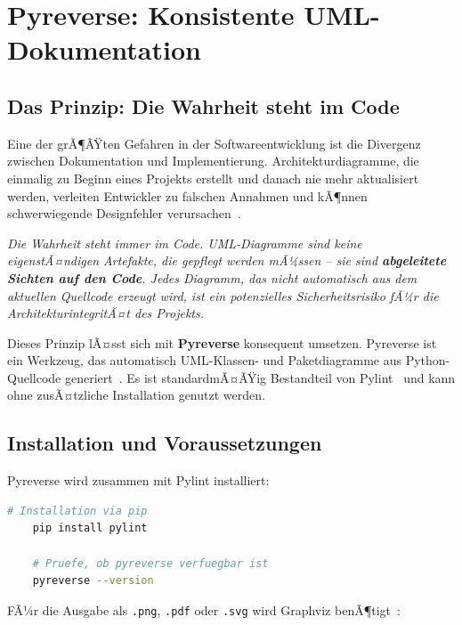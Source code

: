 ﻿\documentclass[a4paper,12pt]{article}
\begin{document}
\section{Pyreverse: Konsistente UML-Dokumentation}
\label{sec:pyreverse}

\subsection{Das Prinzip: Die Wahrheit steht im Code}

Eine der grÃ¶ÃŸten Gefahren in der Softwareentwicklung ist die Divergenz zwischen
Dokumentation und Implementierung. Architekturdiagramme, die einmalig zu Beginn
eines Projekts erstellt und danach nie mehr aktualisiert werden, verleiten
Entwickler zu falschen Annahmen und kÃ¶nnen schwerwiegende Designfehler
verursachen~\cite{kruchten1995}.

\textit{Die Wahrheit steht immer im Code. UML-Diagramme sind keine eigenstÃ¤ndigen
Artefakte, die gepflegt werden mÃ¼ssen -- sie sind \textbf{abgeleitete Sichten auf den Code}. Jedes Diagramm, das nicht automatisch aus dem aktuellen
Quellcode erzeugt wird, ist ein potenzielles Sicherheitsrisiko fÃ¼r die
ArchitekturintegritÃ¤t des Projekts.}

Dieses Prinzip lÃ¤sst sich mit \textbf{Pyreverse} konsequent umsetzen. Pyreverse
ist ein Werkzeug, das automatisch UML-Klassen- und Paketdiagramme aus
Python-Quellcode generiert~\cite{pyreverse2024}. Es ist standardmÃ¤ÃŸig Bestandteil
von Pylint~\cite{pylint2024} und kann ohne zusÃ¤tzliche Installation genutzt werden.

\subsection{Installation und Voraussetzungen}

Pyreverse wird zusammen mit Pylint installiert:

\begin{lstlisting}[language=bash, caption={Installation von Pylint und Pyreverse},
	label={lst:install}]
	# Installation via pip
	pip install pylint
	
	# Pruefe, ob pyreverse verfuegbar ist
	pyreverse --version
\end{lstlisting}

FÃ¼r die Ausgabe als \texttt{.png}, \texttt{.pdf} oder \texttt{.svg} wird
Graphviz benÃ¶tigt~\cite{graphviz2024}:
\end{document}
